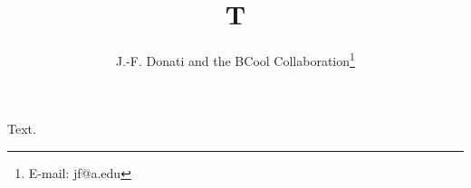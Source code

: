\documentclass{article}
\begin{document}
\title{T}
\author{J.-F. Donati and the BCool Collaboration\thanks{E-mail: jf@a.edu}}
\maketitle
Text.
\end{document}
